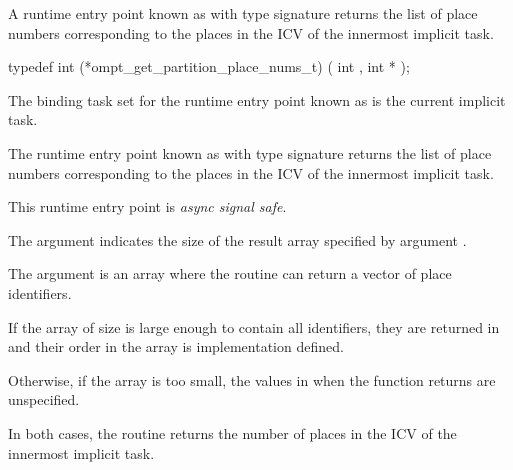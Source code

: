 \label{sec:ompt_get_partition_place_nums_t}
\label{sec:ompt_get_partition_place_nums}

\summary

A runtime entry point known as
 with type signature
returns the list of place numbers corresponding to the places in the 
ICV of the innermost implicit task.

\format

\begin{ccppspecific}
\begin{omptInquiry}
typedef int (*ompt_get_partition_place_nums_t) (
  int ,
  int *
);
\end{omptInquiry}
\end{ccppspecific}


\binding

The binding task set for
the runtime entry point known as 
is the current implicit task.

\descr

The runtime entry point known as
 with type signature
 returns the list of place
numbers corresponding to the places in the 
ICV of the innermost implicit task.

This runtime entry point is \emph{async signal safe}.

\argdesc

The argument  indicates the size of the result
array specified by argument .

The argument  is an array where the routine can return
a vector of place identifiers.

\effect

If the array  of size  is
large enough to contain all identifiers, they are returned in
 and their order in the array is implementation
defined.

Otherwise, if the  array is too small, the values in  when the function returns are unspecified.

In both cases, the routine returns the number of places in the
 ICV of the innermost implicit task.

